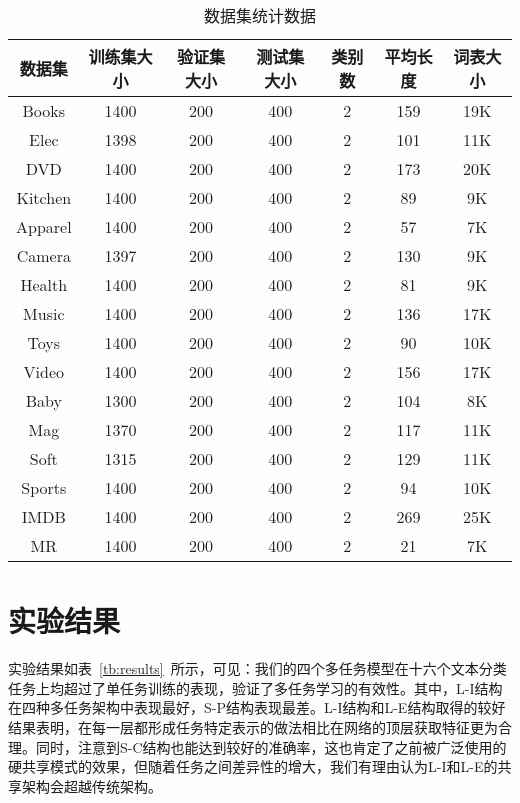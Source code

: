 \begin{table}[htb]
	\centering
	\caption{数据集统计数据}
	\begin{tabular}{ccccccc}
		\toprule[2pt]
		数据集&训练集大小&验证集大小&测试集大小&类别数&平均长度&词表大小\\
		\midrule[1pt]
		Books& 1400& 200& 400& 2& 159& 19K\\
		Elec& 1398& 200& 400& 2& 101& 11K\\
		DVD& 1400& 200& 400& 2& 173& 20K\\
		Kitchen& 1400& 200& 400& 2& 89& 9K\\
		Apparel& 1400& 200& 400& 2& 57& 7K\\
		Camera& 1397& 200& 400& 2& 130& 9K\\
		Health& 1400& 200& 400& 2& 81& 9K\\
		Music& 1400& 200& 400& 2& 136& 17K\\
		Toys& 1400& 200& 400& 2& 90& 10K\\
		Video& 1400& 200& 400& 2& 156& 17K\\
		Baby& 1300& 200& 400& 2& 104& 8K\\
		Mag& 1370& 200& 400& 2& 117& 11K\\
		Soft& 1315& 200& 400& 2& 129& 11K\\
		Sports& 1400& 200& 400& 2& 94& 10K\\
		IMDB& 1400& 200& 400& 2& 269& 25K\\
		MR& 1400& 200& 400& 2& 21& 7K\\
		\bottomrule[2pt]
	\end{tabular}
	\label{tb:dataset}
\end{table}

\section{实验结果}
\label{sec:results}
实验结果如表~\ref{tb:results}~所示，可见：我们的四个多任务模型在十六个文本分类任务上均超过了单任务训练的表现，验证了多任务学习的有效性。其中，L-I结构在四种多任务架构中表现最好，S-P结构表现最差。L-I结构和L-E结构取得的较好结果表明，在每一层都形成任务特定表示的做法相比在网络的顶层获取特征更为合理。同时，注意到S-C结构也能达到较好的准确率，这也肯定了之前被广泛使用的硬共享模式的效果，但随着任务之间差异性的增大，我们有理由认为L-I和L-E的共享架构会超越传统架构。

